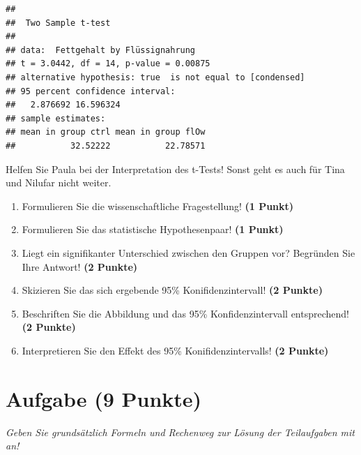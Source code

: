 \documentclass[a4paper, 9pt]{scrartcl}\usepackage[]{graphicx}\usepackage[]{xcolor}
\makeatletter
\newenvironment{kframe}{%
 \def\at@end@of@kframe{}%
 \ifinner\ifhmode%
  \def\at@end@of@kframe{\end{minipage}}%
  \begin{minipage}{\columnwidth}%
 \fi\fi%
 \def\FrameCommand##1{\hskip\@totalleftmargin \hskip-\fboxsep
 \colorbox{shadecolor}{##1}\hskip-\fboxsep
     \hskip-\linewidth \hskip-\@totalleftmargin \hskip\columnwidth}%
 \MakeFramed {\advance\hsize-\width
   \@totalleftmargin\z@ \linewidth\hsize
   \@setminipage}}%
 {\par\unskip\endMakeFramed%
 \at@end@of@kframe}
\newenvironment{knitrout}{}{} %
\makeatother
\begin{document}
\begin{knitrout}
\color{fgcolor}\begin{kframe}
\begin{verbatim}
## 
## 	Two Sample t-test
## 
## data:  Fettgehalt by Flüssignahrung
## t = 3.0442, df = 14, p-value = 0.00875
## alternative hypothesis: true  is not equal to [condensed]
## 95 percent confidence interval:
##   2.876692 16.596324
## sample estimates:
## mean in group ctrl mean in group flOw 
##           32.52222           22.78571
\end{verbatim}
\end{kframe}
\end{knitrout}

Helfen Sie Paula bei der Interpretation des t-Tests! Sonst geht es auch für Tina und Nilufar nicht weiter.

\begin{enumerate}
  \item Formulieren Sie die wissenschaftliche Fragestellung! \textbf{(1 Punkt)}
  \item Formulieren Sie das statistische Hypothesenpaar! \textbf{(1 Punkt)}
\item Liegt ein signifikanter Unterschied zwischen den Gruppen vor? Begründen Sie Ihre Antwort! \textbf{(2 Punkte)}
\item Skizieren Sie das sich ergebende 95\% Konifidenzintervall! \textbf{(2 Punkte)}
\item Beschriften Sie die Abbildung und das 95\% Konfidenzintervall entsprechend! \textbf{(2 Punkte)}  
\item Interpretieren Sie den Effekt des 95\% Konifidenzintervalls! \textbf{(2 Punkte)}
\end{enumerate} 
\clearpage

\section{Aufgabe \hfill (9 Punkte)}

\textit{Geben Sie grundsätzlich Formeln und Rechenweg zur Lösung der Teilaufgaben mit an!} \\[1Ex]
 
\end{document}
